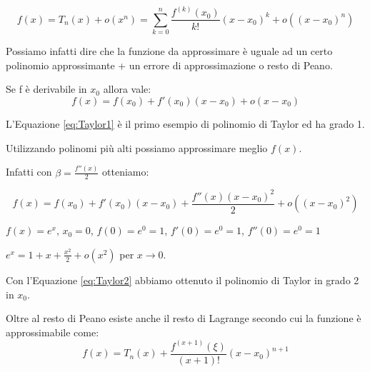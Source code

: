 \begin{equation}
    f(x)=T_n(x)+o(x^n)=\sum_{k=0}^n\frac{f^{(k)}(x_0)}{k!}(x-x_0)^k+o((x-x_0)^n)
\end{equation}

Possiamo infatti dire che la funzione da approssimare è uguale ad un certo polinomio approssimante + un errore di approssimazione o resto di Peano.

\begin{thm}
    Se f è derivabile in $x_0$ allora vale:
    \begin{equation}\label{eq:Taylor1}
        f(x)=f(x_0)+f'(x_0)(x-x_0)+o(x-x_0)
    \end{equation}
\end{thm}

L'Equazione \ref{eq:Taylor1} è il primo esempio di polinomio di Taylor ed ha grado 1.

Utilizzando polinomi più alti possiamo approssimare meglio $f(x)$.

Infatti con $\beta=\frac{f''(x)}{2}$ otteniamo:

\begin{equation}\label{eq:Taylor2}
        f(x)=f(x_0)+f'(x_0)(x-x_0)+\frac{f''(x)(x-x_0)^2}{2}+o((x-x_0)^2)
\end{equation}

\begin{example}
    $f(x)=e^x$, $x_0=0$, $f(0)=e^0=1$, $f'(0)=e^0=1$, $f''(0)=e^0=1$
    
    $e^x=1+x+\frac{x^2}{2}+o(x^2)$ per $x\to 0$.
\end{example}

Con l'Equazione \ref{eq:Taylor2} abbiamo ottenuto il polinomio di Taylor in grado 2 in $x_0$.

Oltre al resto di Peano esiste anche il resto di Lagrange secondo cui la funzione è approssimabile come:
\begin{equation}
    f(x)=T_n(x)+\frac{f^{(x+1)}(\xi)}{(x+1)!}(x-x_0)^{n+1}
\end{equation}

